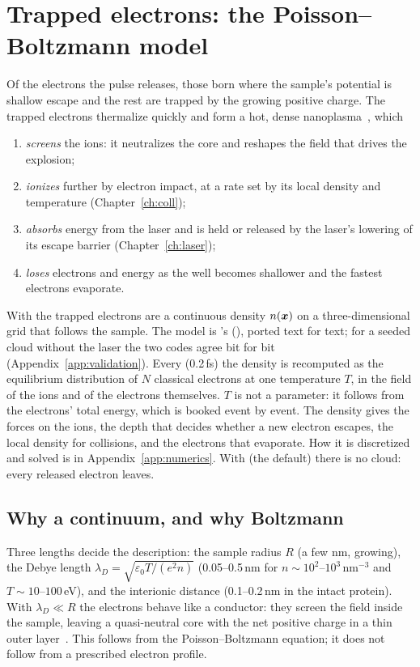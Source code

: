 \chapter{Trapped electrons: the Poisson--Boltzmann model}
\label{ch:pb}

Of the electrons the pulse releases, those born where the sample's potential is shallow escape and the rest are trapped
by the growing positive charge.
The trapped electrons thermalize quickly and form a hot, dense nanoplasma~\cite{ditmire1996,saalmann2006,fennel2010},
which
\begin{enumerate}
  \item \emph{screens} the ions: it neutralizes the core and reshapes the field that drives the explosion;
  \item \emph{ionizes} further by electron impact, at a rate set by its local density and temperature
    (Chapter~\ref{ch:coll});
  \item \emph{absorbs} energy from the laser and is held or released by the laser's lowering of its escape barrier
    (Chapter~\ref{ch:laser});
  \item \emph{loses} electrons and energy as the well becomes shallower and the fastest electrons evaporate.
\end{enumerate}
With  the trapped electrons are a continuous density $n(\bm{x})$ on a
three-dimensional grid that follows the sample.
The model is 's (), ported text for text; for a seeded cloud without the
laser the two codes agree bit for bit (Appendix~\ref{app:validation}).
Every  (0.2\,fs) the density is recomputed as the equilibrium distribution of $N$ classical
electrons at one temperature $T$, in the field of the ions and of the electrons themselves.
$T$ is not a parameter: it follows from the electrons' total energy, which is booked event by event.
The density gives the forces on the ions, the depth that decides whether a new electron escapes, the local density
for collisions, and the electrons that evaporate.
How it is discretized and solved is in Appendix~\ref{app:numerics}.
With  (the default) there is no cloud: every released electron leaves.

\section{Why a continuum, and why Boltzmann}

Three lengths decide the description: the sample radius $R$ (a few nm, growing), the Debye length
$\lambda_D = \sqrt{\varepsilon_0T/(e^2n)}$ (0.05--0.5\,nm for $n\sim10^2$--$10^3$\,nm$^{-3}$ and $T\sim10$--$100$\,eV), and
the interionic distance (0.1--0.2\,nm in the intact protein).
With $\lambda_D\ll R$ the electrons behave like a conductor: they screen the field inside the sample, leaving a
quasi-neutral core with the net positive charge in a thin outer layer~\cite{chen2016}.
This follows from the Poisson--Boltzmann equation; it does not follow from a prescribed electron profile.

